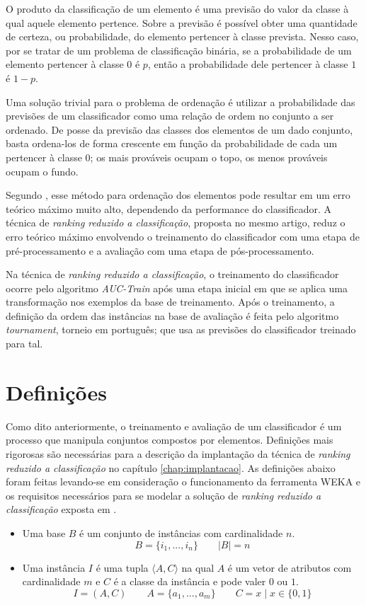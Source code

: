 O produto da classificação de um elemento é uma previsão do valor da classe à qual aquele elemento pertence. Sobre a previsão é possível obter uma quantidade de certeza, ou probabilidade, do elemento pertencer à classe prevista. Nesso caso, por se tratar de um problema de classificação binária, se a probabilidade de um elemento pertencer à classe $0$ é $p$, então a probabilidade dele pertencer à classe $1$ é $1 - p$.

Uma solução trivial para o problema de ordenação é utilizar a probabilidade das previsões de um classificador como uma relação de ordem no conjunto a ser ordenado. De posse da previsão das classes dos elementos de um dado conjunto, basta ordena-los de forma crescente em função da probabilidade de cada um pertencer à classe $0$; os mais prováveis ocupam o topo, os menos prováveis ocupam o fundo.

Segundo \cite{langford08}, esse método para ordenação dos elementos pode resultar em um erro teórico máximo muito alto, dependendo da performance do classificador. A técnica de \emph{ranking reduzido a classificação}, proposta no mesmo artigo, reduz o erro teórico máximo envolvendo o treinamento do classificador com uma etapa de pré-processamento e a avaliação com uma etapa de pós-processamento.

Na técnica de \emph{ranking reduzido a classificação}, o treinamento do classificador ocorre pelo algoritmo \emph{AUC-Train} após uma etapa inicial em que se aplica uma transformação nos exemplos da base de treinamento. Após o treinamento, a definição da ordem das instâncias na base de avaliação é feita pelo algoritmo \emph{tournament}, torneio em português; que usa as previsões do classificador treinado para tal.

\section{Definições}

Como dito anteriormente, o treinamento e avaliação de um classificador é um processo que manipula conjuntos compostos por elementos. Definições mais rigorosas são necessárias para a descrição da implantação da técnica de \emph{ranking reduzido a classificação} no capítulo \ref{chap:implantacao}. As definições abaixo foram feitas levando-se em consideração o funcionamento da ferramenta WEKA e os requisitos necessários para se modelar a solução de \emph{ranking reduzido a classificação} exposta em \cite{langford08}.

\begin{itemize}
    \item Uma base $B$ é um conjunto de instâncias com cardinalidade $n$.
    \[B = \{i_1, ..., i_n\} \qquad |B| = n\]

    \item Uma instância $I$ é uma tupla $\langle A, C \rangle$ na qual $A$ é um vetor de atributos com cardinalidade $m$ e $C$ é a classe da instância e pode valer $0$ ou $1$.
    \[I = (A, C) \qquad A = \{a_1, ..., a_m\} \qquad C = x \; | \; x \in \{0, 1\}\]
\end{itemize}

